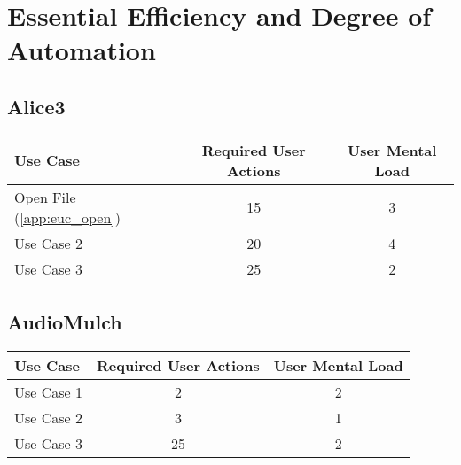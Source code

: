 \section{Essential Efficiency and Degree of Automation}

\subsection{Alice3}


\begin{tabularx}{\textwidth}{Xcc}
\textbf{Use Case} & \textbf{Required User Actions} & \textbf{User Mental Load}\\
\hline
Open File (\ref{app:euc_open}) & 15 & 3 \\
Use Case 2                          & 20 & 4 \\
Use Case 3                          & 25 & 2
\end{tabularx}

\subsection{AudioMulch}




\begin{tabularx}{\textwidth}{Xcc}
\textbf{Use Case} & \textbf{Required User Actions} & \textbf{User Mental Load}\\
\hline
Use Case 1                          & 2 & 2 \\
Use Case 2                          & 3 & 1 \\
Use Case 3                          & 25 & 2
\end{tabularx}

